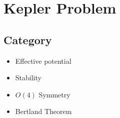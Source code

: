
\section{\label{sec:Kepler}Kepler Problem}

\subsection{\label{sec:Kepler_Category}Category}

	\begin{itemize}
		\item
		Effective potential
		\item
		Stability
		\item
		$O(4)$ Symmetry
		\item
		Bertland Theorem
	\end{itemize}
